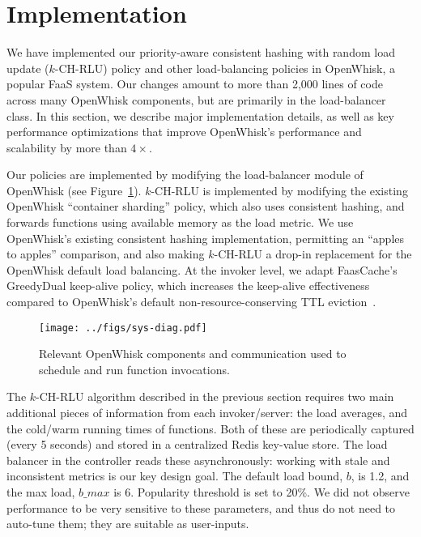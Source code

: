\section{Implementation}
\label{sec:impl}

We have implemented our priority-aware consistent hashing with random load update ($k$-CH-RLU) policy and other load-balancing policies in OpenWhisk, a popular FaaS system.
Our changes amount to more than 2,000 lines of code across many OpenWhisk components, but are primarily in the load-balancer class. 
In this section, we describe major implementation details, as well as key performance optimizations that improve OpenWhisk's performance and scalability by more than $4\times$. 

Our policies are implemented by modifying the load-balancer module of OpenWhisk (see Figure~\ref{fig:sys-diag}). 
$k$-CH-RLU is implemented by modifying the existing OpenWhisk ``container sharding'' policy, which also uses consistent hashing, and forwards functions using available memory as the load metric.
We use OpenWhisk's existing consistent hashing implementation, permitting an ``apples to apples'' comparison, and also making $k$-CH-RLU a drop-in replacement for the OpenWhisk default load balancing. 
At the invoker level, we adapt FaasCache's GreedyDual keep-alive policy, which increases the keep-alive effectiveness compared to OpenWhisk's default non-resource-conserving TTL eviction~\cite{faascache-asplos21}. 

\begin{figure} \centering
\texttt{[image: ../figs/sys-diag.pdf]}
  \caption{Relevant OpenWhisk components and communication used to schedule and run function invocations.}
  \label{fig:sys-diag}
\end{figure}

The $k$-CH-RLU algorithm described in the previous section requires two main additional pieces of information from each invoker/server: the load averages, and the cold/warm running times of functions. 
Both of these are periodically captured (every 5 seconds) and stored in a centralized Redis key-value store.
The load balancer in the controller reads these asynchronously: working with stale and inconsistent metrics is our key design goal. 
The default load bound, $b$, is 1.2, and the max load, $b\_max$ is 6. Popularity threshold is set to 20\%.
We did not observe performance to be very sensitive to these parameters, and thus do not need to auto-tune them; they are suitable as user-inputs. 

